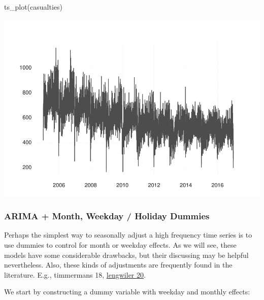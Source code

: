 \begin{Schunk}
\begin{Sinput}
ts_plot(casualties)
\end{Sinput}

\includegraphics[width=1\linewidth]{overview_files/figure-latex/unnamed-chunk-2-1} \end{Schunk}

\hypertarget{arima-month-weekday-holiday-dummies}{%
\subsubsection{ARIMA + Month, Weekday / Holiday
Dummies}\label{arima-month-weekday-holiday-dummies}}

Perhaps the simplest way to seasonally adjust a high frequency time
series is to use dummies to control for month or weekday effects. As we
will see, these models have some considerable drawbacks, but their
discussing may be helpful nevertheless. Also, these kinds of adjustments
are frequently found in the literature. E.g., timmermans 18,
\href{https://sjes.springeropen.com/articles/10.1186/s41937-020-00052-y}{lengwiler
20}.

We start by constructing a dummy variable with weekday and monthly
effects:

